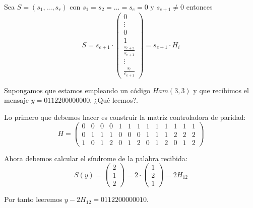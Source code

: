 \obs Sea $S=(s_1,...,s_r)$ con $s_1=s_2=...=s_e=0$ y $s_{e+1} \neq 0$ entonces
\[S = s_{e+1}\cdot \left( \begin{array}{c} 0 \\ \vdots \\ 0 \\ 1 \\ \frac{s_{e+2}}{s_{e+1}} \\ \vdots \\ \frac{s_{r}}{e_{e+1}}\end{array}\right)=s_{e+1}\cdot H_i\]

\begin{example}
Supongamos que estamos empleando un código $Ham(3,3)$ y que recibimos el mensaje $y=0112200000000$, ¿Qué leemos?.

Lo primero que debemos hacer es construir la matriz controladora de paridad:
\[H = \left(\begin{array}{ccccccccccccc}
0 & 0 & 0 & 0 & 1 & 1 & 1 & 1 & 1 & 1 & 1 & 1 & 1\\
0 & 1 & 1 & 1 & 0 & 0 & 0 & 1 & 1 & 1 & 2 & 2 & 2\\
1 & 0 & 1 & 2 & 0 & 1 & 2 & 0 & 1 & 2 & 0 & 1 & 2
\end{array}\right)\]

Ahora debemos calcular el síndrome de la palabra recibida:
\[S(y) = \left(\begin{array}{c} 2 \\ 1 \\ 2\end{array} \right) = 2 \cdot  \left(\begin{array}{c} 1 \\ 2 \\ 1\end{array} \right) = 2H_{12}\]

Por tanto leeremos $y-2H_{12}=0112200000010$.
\end{example}

